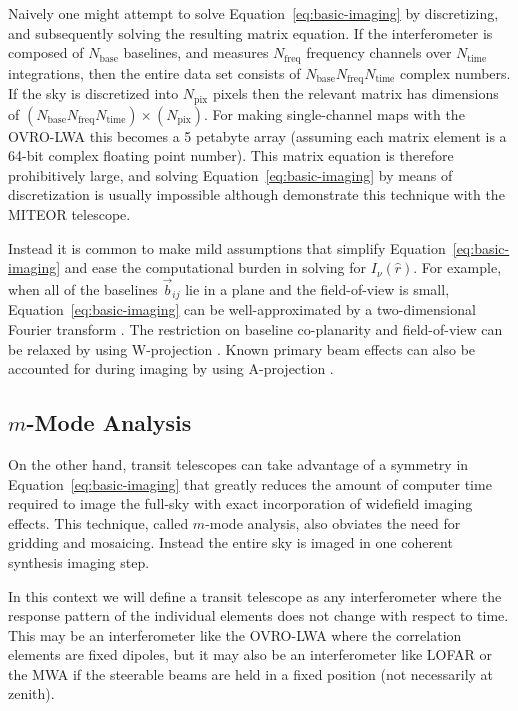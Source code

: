 \documentclass[twocolumn]{aastex61}
\begin{document}
Naively one might attempt to solve Equation~\ref{eq:basic-imaging} by discretizing, and subsequently
solving the resulting matrix equation. If the interferometer is composed of $N_\text{base}$
baselines, and measures $N_\text{freq}$ frequency channels over $N_\text{time}$ integrations, then
the entire data set consists of $N_\text{base}N_\text{freq}N_\text{time}$ complex numbers. If the
sky is discretized into $N_\text{pix}$ pixels then the relevant matrix has dimensions of
$(N_\text{base}N_\text{freq}N_\text{time})\times(N_\text{pix})$. For making single-channel maps with
the OVRO-LWA this becomes a 5 petabyte array (assuming each matrix element is a 64-bit complex
floating point number).  This matrix equation is therefore prohibitively large, and solving
Equation~\ref{eq:basic-imaging} by means of discretization is usually impossible although
\citet{2017MNRAS.465.2901Z} demonstrate this technique with the MITEOR telescope.

Instead it is common to make mild assumptions that simplify Equation~\ref{eq:basic-imaging} and ease
the computational burden in solving for $I_\nu(\hat r)$. For example, when all of the baselines
$\vec b_{ij}$ lie in a plane and the field-of-view is small, Equation~\ref{eq:basic-imaging} can be
well-approximated by a two-dimensional Fourier transform \citep{2001isra.book.....T}. The
restriction on baseline co-planarity and field-of-view can be relaxed by using W-projection
\citep{2008ISTSP...2..647C}. Known primary beam effects can also be accounted for during imaging by
using A-projection \citep{2013ApJ...770...91B}.

\subsection{$m$-Mode Analysis}

On the other hand, transit telescopes can take advantage of a symmetry in
Equation~\ref{eq:basic-imaging} that greatly reduces the amount of computer time required to image
the full-sky with exact incorporation of widefield imaging effects. This technique, called $m$-mode
analysis, also obviates the need for gridding and mosaicing. Instead the entire sky is imaged in one
coherent synthesis imaging step.

In this context we will define a transit telescope as any interferometer where the response pattern
of the individual elements does not change with respect to time. This may be an interferometer like
the OVRO-LWA where the correlation elements are fixed dipoles, but it may also be an interferometer
like LOFAR or the MWA if the steerable beams are held in a fixed position (not necessarily at
zenith).
\end{document}
